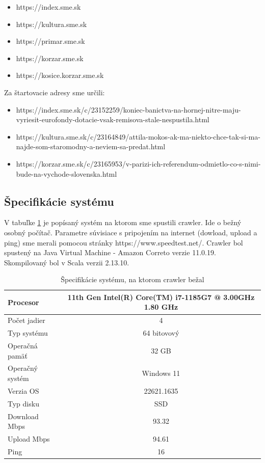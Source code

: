 \begin{itemize}
    \item https://index.sme.sk
    \item https://kultura.sme.sk
    \item https://primar.sme.sk
    \item https://korzar.sme.sk
    \item https://kosice.korzar.sme.sk
\end{itemize}

Za štartovacie adresy sme určili:
\begin{itemize}  
    \item https://index.sme.sk/c/23152259/koniec-banictva-na-hornej-nitre-maju-vyriesit-eurofondy-dotacie-vsak-remisova-stale-nespustila.html
    \item https://kultura.sme.sk/c/23164849/attila-mokos-ak-ma-niekto-chce-tak-si-ma-najde-som-staromodny-a-neviem-sa-predat.html
    \item https://korzar.sme.sk/c/23165953/v-parizi-ich-referendum-odmietlo-co-s-nimi-bude-na-vychode-slovenska.html
    
\end{itemize}

\subsection{Špecifikácie systému}

V tabuľke \ref{t:1} je popísaný systém na ktorom sme spustili crawler. Ide o bežný osobný počítač. Parametre súvisiace s pripojením na internet (dowload, upload a ping) sme merali pomocou stránky https://www.speedtest.net/. 
Crawler bol spustený na Java Virtual Machine - Amazon Correto verzie 11.0.19. Skompilovaný bol v Scala verzii 2.13.10. 

\begin{table}[!ht]
	\caption{Špecifikácie systému, na ktorom crawler bežal}\label{t:1}
	\smallskip
	\centering
\begin{tabular}{ | l | c |}
 \hline
 Procesor &  11th Gen Intel(R) Core(TM) i7-1185G7 @ 3.00GHz   1.80 GHz \\ 
 \hline
 Počet jadier & 4  \\  
 \hline
 Typ systému & 64 bitovový \\
 \hline
 Operačná pamäť & 32 GB \\
 \hline
 Operačný systém & Windows 11 \\
 \hline
 Verzia OS & 22621.1635 \\
 \hline
 Typ disku & SSD \\
 \hline
 Download Mbps  & 93.32 \\
 \hline
 Upload Mbps & 94.61 \\
 \hline
 Ping  & 16 \\
 \hline
\end{tabular}
\end{table}


